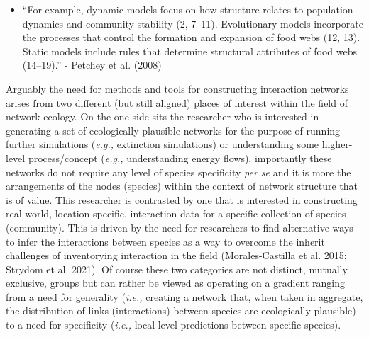 \documentclass[
  letterpaper,
  DIV=11,
  numbers=noendperiod]{scrartcl}
\providecommand{\tightlist}{%
  \setlength{\itemsep}{0pt}\setlength{\parskip}{0pt}}\usepackage{longtable,booktabs,array}
\begin{document}
\begin{itemize}
  \begin{itemize}
  \tightlist
  \item
    ``For example, dynamic models focus on how structure relates to
    population dynamics and community stability (2, 7--11). Evolutionary
    models incorporate the processes that control the formation and
    expansion of food webs (12, 13). Static models include rules that
    determine structural attributes of food webs (14--19).'' - Petchey
    et al. (2008)
  \end{itemize}
\end{itemize}

Arguably the need for methods and tools for constructing interaction
networks arises from two different (but still aligned) places of
interest within the field of network ecology. On the one side sits the
researcher who is interested in generating a set of ecologically
plausible networks for the purpose of running further simulations
(\emph{e.g.,} extinction simulations) or understanding some higher-level
process/concept (\emph{e.g.,} understanding energy flows), importantly
these networks do not require any level of species specificity \emph{per
se} and it is more the arrangements of the nodes (species) within the
context of network structure that is of value. This researcher is
contrasted by one that is interested in constructing real-world,
location specific, interaction data for a specific collection of species
(community). This is driven by the need for researchers to find
alternative ways to infer the interactions between species as a way to
overcome the inherit challenges of inventorying interaction in the field
(Morales-Castilla et al. 2015; Strydom et al. 2021). Of course these two
categories are not distinct, mutually exclusive, groups but can rather
be viewed as operating on a gradient ranging from a need for generality
(\emph{i.e.,} creating a network that, when taken in aggregate, the
distribution of links (interactions) between species are ecologically
plausible) to a need for specificity (\emph{i.e.,} local-level
predictions between specific species).
\end{document}
